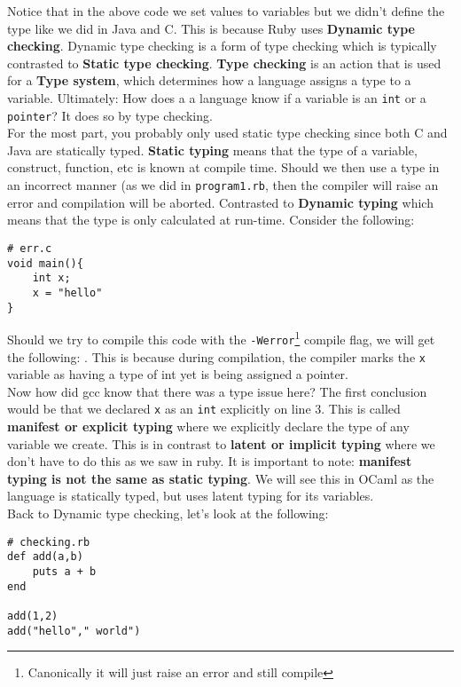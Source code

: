 \documentclass[main.tex]{subfiles}
\begin{document}
Notice that in the above code we set values to variables but we didn't define the type like we did in Java and C.
This is because Ruby uses \textbf{Dynamic type checking}. 
Dynamic type checking is a form of type checking which is typically contrasted to \textbf{Static type checking}. 
\textbf{Type checking} is an action that is used for a \textbf{Type system}, which determines how a language assigns a type to a variable.
Ultimately: How does a a language know if a variable is an \texttt{int} or a \texttt{pointer}? 
It does so by type checking.\\

\newpage
For the most part, you probably only used static type checking since both C and Java are statically typed.
\textbf{Static typing} means that the type of a variable, construct, function, etc is known at compile time.
Should we then use a type in an incorrect manner (as we did in \texttt{program1.rb}, then the compiler will raise an error and compilation will be aborted.
Contrasted to \textbf{Dynamic typing} which means that the type is only calculated at run-time.
Consider the following:
\begin{lstlisting}[style=MyCStyle]
# err.c
void main(){
    int x;
    x = "hello"
}
\end{lstlisting}
Should we try to compile this code with the \texttt{-Werror}\footnote{Canonically it will just raise an error and still compile} compile flag, we will get the following: . This is because during compilation, the compiler marks the \texttt{x} variable as having a type of int yet is being assigned a pointer.\\

Now how did gcc know that there was a type issue here? 
The first conclusion would be that we declared \texttt{x} as an \texttt{int} explicitly on line 3. 
This is called \textbf{manifest or explicit typing} where we explicitly declare the type of any variable we create.
This is in contrast to \textbf{latent or implicit typing} where we don't have to do this as we saw in ruby.
It is important to note: \textbf{manifest typing is not the same as static typing}.
We will see this in OCaml as the language is statically typed, but uses latent typing for its variables.\\

Back to Dynamic type checking, let's look at the following:
\begin{lstlisting}[style=MyRubyStyle]
# checking.rb
def add(a,b)
    puts a + b
end

add(1,2)
add("hello"," world")
\end{lstlisting}
\end{document}
